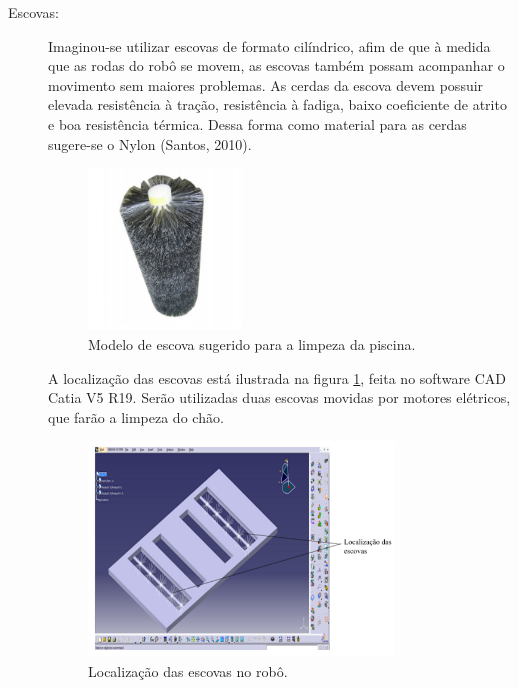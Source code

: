 \begin{description}
\item[Escovas:] Imaginou-se utilizar escovas de formato cilíndrico, afim de que
à medida que as rodas do robô se movem, as escovas também possam acompanhar o
movimento sem maiores problemas. As cerdas da escova devem possuir elevada
resistência à tração, resistência à fadiga, baixo coeficiente de atrito e boa
resistência térmica. Dessa forma como material para as cerdas sugere-se o
Nylon (Santos, 2010).
\par
\begin{figure}[h]
  \centering
  \includegraphics[width=0.4\textwidth]{figures/brush.png}
  \caption{Modelo de escova sugerido para a limpeza da piscina.}
  \label{fig:wheels}
\end{figure}
\FloatBarrier
A localização das escovas está ilustrada na figura \ref{fig:wheels}, feita no software
\textsf{CAD Catia V5 R19}. Serão utilizadas duas escovas movidas por motores elétricos,
que farão a limpeza do chão.
\par
\begin{figure}[h]
  \centering
  \includegraphics[width=0.8\textwidth]{figures/brush-local.png}
  \caption{Localização das escovas no robô.}
  \label{fig:brush-local}
\end{figure}
\FloatBarrier
\par

\end{description}
